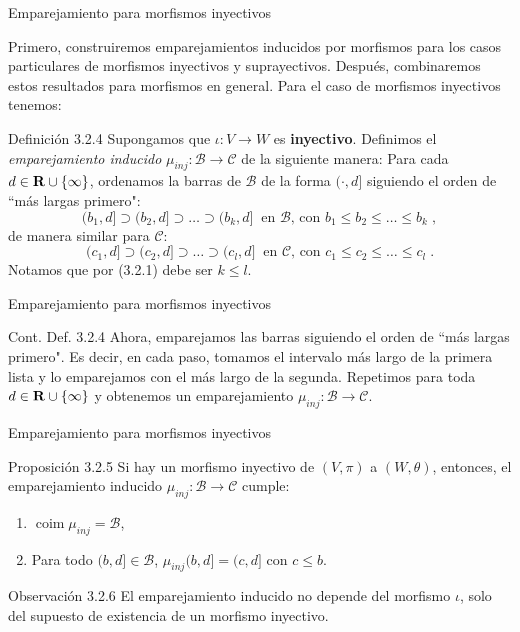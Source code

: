 \documentclass{beamer}
\newcommand{\calB}{{\mathcal{B}}}
\newcommand{\calC}{{\mathcal{C}}}
\DeclareMathOperator{\coim}{coim}
\def\R\re
\def \R{{\bf R}}
\def \re{{\mathbb R}}
\begin{document}
\begin{frame}{Emparejamiento para morfismos inyectivos}

Primero, construiremos emparejamientos inducidos por morfismos para los casos particulares de morfismos inyectivos y suprayectivos. Después, combinaremos estos resultados para morfismos en general.
\pause
Para el caso de morfismos inyectivos tenemos:
\pause

\begin{block}{Definición 3.2.4}
Supongamos que $\iota: V \to W$ es \textbf{inyectivo}.
	Definimos el \emph{emparejamiento inducido} $\mu_{inj} : \calB \to \calC$ de la siguiente manera: Para cada $d\in \R \cup \{\infty\}$, ordenamos la barras de $\calB$ de la forma $(\cdot, d]$ siguiendo el orden de ``más largas primero":
	$$
	(b_1, d] \supset (b_2, d] \supset \ldots \supset (b_k, d] \ \text{ en $\calB$, con } b_1\leq b_2 \leq \ldots \leq b_k \;,
	$$
 \pause
	de manera similar para $\calC$:
	$$
	(c_1, d] \supset (c_2, d] \supset \ldots \supset (c_l, d] \ \text{ en $\calC$, con } c_1\leq c_2 \leq \ldots \leq c_l \;.
	$$	
 \pause
 Notamos que por (3.2.1) debe ser $k\leq l$.
 \end{block}
 \end{frame}
	\begin{frame}{Emparejamiento para morfismos inyectivos}
	    
	\begin{block}{Cont. Def. 3.2.4}
	Ahora, emparejamos las barras siguiendo el orden de ``más largas primero". Es decir, en cada paso, tomamos el intervalo más largo de la primera lista y lo emparejamos con el más largo de la segunda.
 \pause
	Repetimos para toda $d \in \R \cup \{\infty\}$ y obtenemos un emparejamiento $\mu_{inj} : \calB \to \calC$.
\end{block}
\end{frame}

\begin{frame}{Emparejamiento para morfismos inyectivos}
\begin{block}{Proposición 3.2.5}
		Si hay un morfismo inyectivo de $(V, \pi)$ a $(W, \theta)$, entonces, el emparejamiento inducido $\mu_{inj}: \calB \to \calC$ cumple:
	\begin{enumerate}[(1)]
		\item
			$\coim \mu_{inj} = \calB$,
   \pause
		\item
			Para todo $(b,d] \in \calB$, $\mu_{inj} (b,d] = (c,d]$ con $c\leq b$.
	\end{enumerate}	
\end{block}
\pause
\begin{block}{Observación 3.2.6}
    El emparejamiento inducido no depende del morfismo $\iota$, solo del supuesto de existencia de un morfismo inyectivo. 
\end{block}
\end{frame}
\end{document}
